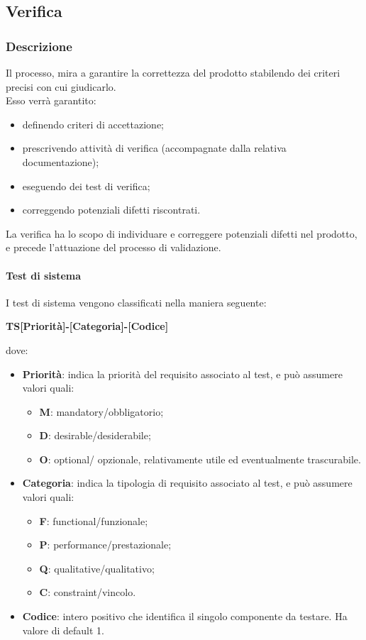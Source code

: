\subsection{Verifica}
		\subsubsection{Descrizione}
		Il processo, mira a garantire la correttezza del prodotto stabilendo dei criteri precisi con cui giudicarlo. \\ Esso verrà garantito:
		\begin{itemize}
			\item definendo criteri di accettazione;
			\item prescrivendo attività di verifica (accompagnate dalla relativa documentazione);
			\item eseguendo dei test di verifica;
			\item correggendo potenziali difetti riscontrati.
		\end{itemize}
		La verifica ha lo scopo di individuare e correggere potenziali difetti nel prodotto, e precede l'attuazione del processo di validazione.
		
					
		\paragraph{Test di sistema}
		I test di sistema vengono classificati nella maniera seguente:
		\begin{center}
			\textbf{TS[Priorità]-[Categoria]-[Codice]}
		\end{center}		 
		dove:\\
		\begin{itemize}
			\item \textbf{Priorità}: indica la priorità del requisito associato al test, e può assumere valori quali:
			\begin{itemize}
				\item \textbf{M}: mandatory/obbligatorio;
				\item \textbf{D}: desirable/desiderabile;
				\item \textbf{O}: optional/ opzionale, relativamente utile ed eventualmente trascurabile.
			\end{itemize}
			\item \textbf{Categoria}: indica la tipologia di requisito associato al test, e può assumere valori quali:
			\begin{itemize}
				\item \textbf{F}: functional/funzionale;
				\item \textbf{P}: performance/prestazionale;
				\item \textbf{Q}: qualitative/qualitativo;
				\item \textbf{C}: constraint/vincolo.
			\end{itemize}
			\item \textbf{Codice}: intero positivo che identifica il singolo componente da testare. Ha valore di default 1.
		\end{itemize}
		 
